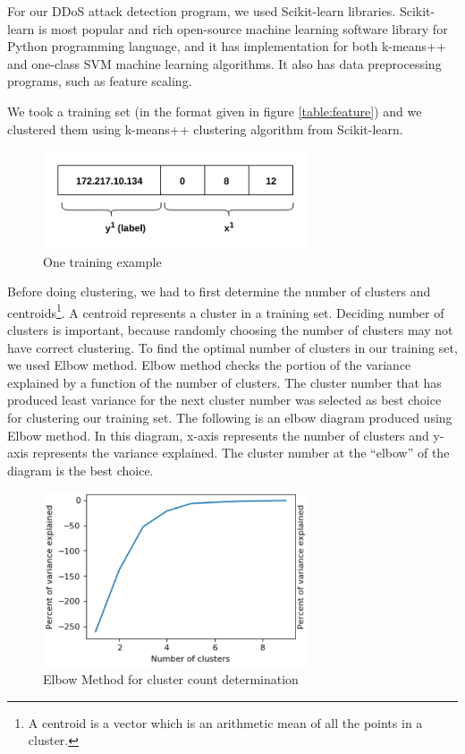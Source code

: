 \documentclass[12pt,oneside,a4paper]{article}
\begin{document}
For our DDoS attack detection program, we used Scikit-learn libraries. Scikit-learn is most popular and rich open-source machine learning software library for Python programming language, and it has implementation for both k-means++ and one-class SVM machine learning algorithms. It also has data preprocessing programs, such as feature scaling.

We took a training set (in the format given in figure \ref{table:feature}) and we clustered them using k-means++ clustering algorithm from Scikit-learn.

\begin{figure}[H]
\centering
\includegraphics[width=0.70\textwidth]{training_example.png}
\caption{One training example} \label{fig:training_example}
\end{figure}

Before doing clustering, we had to first determine the number of clusters and centroids\footnote{A centroid is a vector which is an arithmetic mean of all the points in a cluster.}. A centroid represents a cluster in a training set. Deciding number of clusters is important, because randomly choosing the number of clusters may not have correct clustering. To find the optimal number of clusters in our training set, we used Elbow method. Elbow method checks the portion of the variance explained by a function of the number of clusters. The cluster number that has produced least variance for the next cluster number was selected as best choice for clustering our training set. The following is an elbow diagram produced using Elbow method. In this diagram, x-axis represents the number of clusters and y-axis represents the variance explained. The cluster number at the ``elbow'' of the diagram is the best choice.

\begin{figure}[H]
\centering
\includegraphics[width=0.70\textwidth]{elbow-method.png}
\caption{Elbow Method for cluster count determination} \label{fig:elbow-method}
\end{figure}
\end{document}
